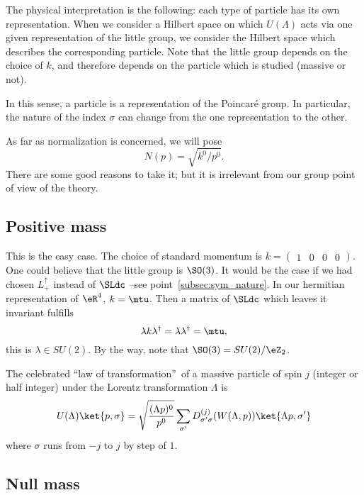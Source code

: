 The physical interpretation is the following\label{pg:phyz_reprez}: each type of particle has its own representation. When we consider a Hilbert space on which $U(\Lambda)$ acts via one given representation of the little group, we consider the Hilbert space which describes the corresponding particle. Note that the little group depends on the choice of $k$, and therefore depends on the particle which is studied (massive or not).

In this sense, a particle is a representation of the Poincaré group. In particular, the nature of the index $\sigma$ can change from the one representation to the other.

\begin{remark}
	As far as normalization is concerned, we will pose
	\[
		N(p)=\sqrt{k^0/p^0}.
	\]
	There are some good reasons to take it; but it is irrelevant from our group point of view of the theory.
\end{remark}

\subsection{Positive mass}

This is the easy case. The choice of standard momentum is $k=\begin{pmatrix}1&0&0&0\end{pmatrix}$. One could believe that the little group is $\SO(3)$. It would be the case if we had chosen $L_+^{\uparrow}$ instead of $\SLdc$ --see point~\ref{subsec:sym_nature}. In our hermitian representation of $\eR^4$, $k=\mtu$. Then a matrix of $\SLdc$ which leaves it invariant fulfills
\[
	\lambda k\lambda^{\dag}=\lambda\lambda^{\dag}=\mtu,
\]
this is $\lambda\in SU(2)$. By the way, note that $\SO(3)=SU(2)/\eZ_2$.

The celebrated ``law of transformation''\ of a massive particle of spin $j$ (integer or half integer) under the Lorentz transformation $\Lambda$ is
\begin{equation}
	U(\Lambda)\ket{p,\sigma}=\sqrt{\frac{ (\Lambda p)^0 }{p^0}}
	\sum_{\sigma'}D^{(j)}_{\sigma'\sigma}(W(\Lambda,p))\ket{\Lambda p,\sigma'}
\end{equation}
where $\sigma$ runs from $-j$ to $j$ by step of $1$.

\subsection{Null mass}

